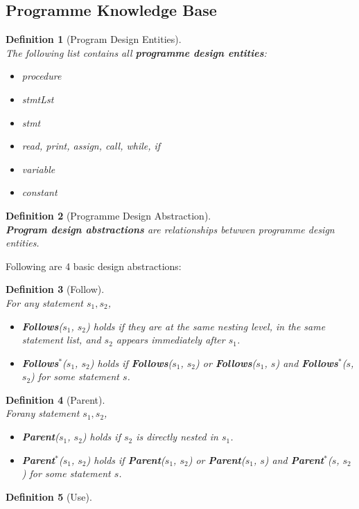\documentclass[12pt]{article}
\newtheorem{definition}{Definition}[section]
\theoremstyle{definition}
\begin{document}
\subsection{Programme Knowledge Base}
\begin{definition}[Program Design Entities]
\hfill\\\normalfont The following list contains all \textbf{programme design entities}:
\begin{itemize}
	\item procedure
	\item stmtLst
	\item stmt
	\item read, print, assign, call, while, if
	\item variable
	\item constant
\end{itemize}
\end{definition}
\begin{definition}[Programme Design Abstraction]
\hfill\\\normalfont \textbf{Program design abstractions} are \textit{relationships} betwwen programme design entities.
\end{definition}
Following are 4 basic design abstractions:
\begin{definition}[Follow]
\hfill\\\normalfont For any statement $s_1, s_2$, 
\begin{itemize}
	\item \textbf{Follows}($s_1$, $s_2$) holds if they are at the same nesting level, in the same statement list, and $s_2$ appears \textit{immediately} after $s_1$.
	\item \textbf{Follows}$^*$($s_1$, $s_2$) holds \textit{if} \textbf{Follows}($s_1$, $s_2$) \textit{or} \textbf{Follows}($s_1$, $s$) and \textbf{Follows}$^*$($s$, $s_2$) for some statement $s$.
\end{itemize}
\end{definition}
\begin{definition}[Parent]
\hfill\\\normalfont Forany statement $s_1, s_2$, 
\begin{itemize} 
	\item \textbf{Parent}($s_1$, $s_2$) holds if $s_2$ is directly nested in $s_1$.
	\item \textbf{Parent}$^*$($s_1$, $s_2$) holds \textit{if} \textbf{Parent}($s_1$, $s_2$) \textit{or} \textbf{Parent}($s_1$, $s$) and \textbf{Parent}$^*$($s$, $s_2$) for some statement $s$.
\end{itemize}
\end{definition}
\begin{definition}[Use]
\hfill\\\normalfont 
\end{definition}
\end{document}
